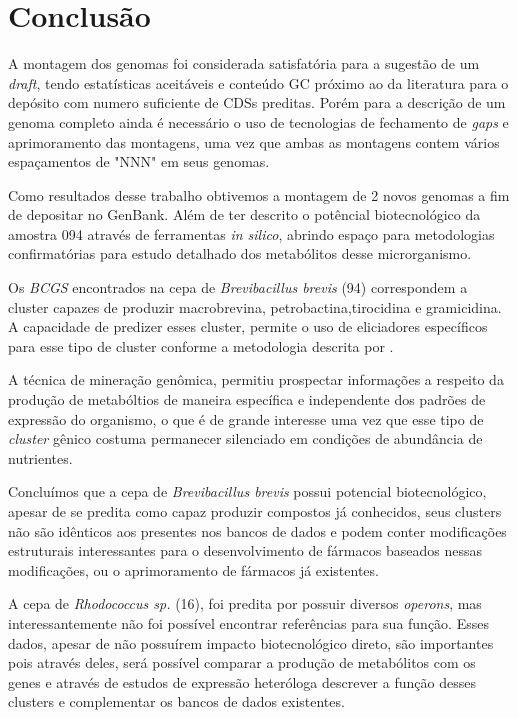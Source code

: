 \chapter{Conclusão}
\label{conclusao}


A montagem dos genomas foi considerada satisfatória para a sugestão de um \textit{draft}, tendo
estatísticas aceitáveis e conteúdo GC próximo ao da literatura para o depósito com numero suficiente de CDSs preditas. Porém para a descrição
de um genoma completo ainda é necessário o uso de tecnologias de fechamento de \textit{gaps} e aprimoramento
das montagens, uma vez que ambas as montagens contem vários espaçamentos de "NNN" em seus genomas.

Como resultados desse trabalho obtivemos a montagem de 2 novos genomas a fim de depositar no GenBank. Além de ter descrito o potêncial biotecnológico da amostra 094
através de ferramentas \textit{in silico}, abrindo espaço para metodologias confirmatórias para
estudo detalhado dos metabólitos desse microrganismo.

Os \textit{BCGS} encontrados na cepa de \textit{Brevibacillus brevis} (94) correspondem a cluster capazes de produzir macrobrevina,
petrobactina,tirocidina e gramicidina. A capacidade de predizer esses cluster, permite o
uso de eliciadores específicos para esse tipo de cluster conforme a metodologia descrita por .

A técnica de mineração genômica, permitiu prospectar informações a respeito
da produção de metabóltios de maneira específica e independente dos padrões de expressão 
do organismo, o que é de grande interesse uma vez que esse tipo de \textit{cluster} gênico costuma permanecer
silenciado em condições de abundância de nutrientes.

Concluímos que a cepa de \textit{Brevibacillus brevis } possui potencial biotecnológico, apesar de se predita 
como capaz produzir compostos já conhecidos, seus clusters não são idênticos aos presentes nos bancos 
de dados e podem conter modificações estruturais interessantes para o desenvolvimento
de fármacos baseados nessas modificações, ou o aprimoramento de fármacos já existentes.

A cepa de \textit{Rhodococcus sp.} (16), foi predita por possuir diversos \textit{operons}, mas interessantemente
não foi possível encontrar referências para sua função. Esses dados, apesar de não possuírem
impacto biotecnológico direto, são importantes pois através deles, será possível comparar a produção
de metabólitos com os genes e através de estudos de expressão heteróloga descrever a função
desses clusters e complementar os bancos de dados existentes.

